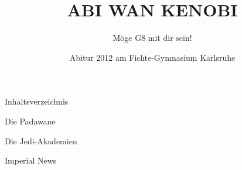 
\usepackage{pdfpages}

\AddEverypageHook{\ifnum\value{usegfc}=1 \makegbg \makefoot \fi}

\title{ABI WAN KENOBI}
\subtitle{\vspace{1cm}Möge G8 mit dir sein!}
\author{\vspace{2cm}}
\date{\Dekar Abitur 2012 am Fichte-Gymnasium Karlsruhe}
\maketitle
\thispagestyle{empty}
\newpage

\newcommand{\mychapter}[1]{
  \renewcommand{\generictitle}{#1}
  \cleardoublepage
  \gfoff
  #1
  \newpage
  \gfon
}


\newpage


\newpage

Inhaltsverzeichnis


\mychapter{Die Padawane}



\mychapter{Die Jedi-Akademien}



\mychapter{Imperial News}
\begin{multicols}{2}

\end{multicols}



